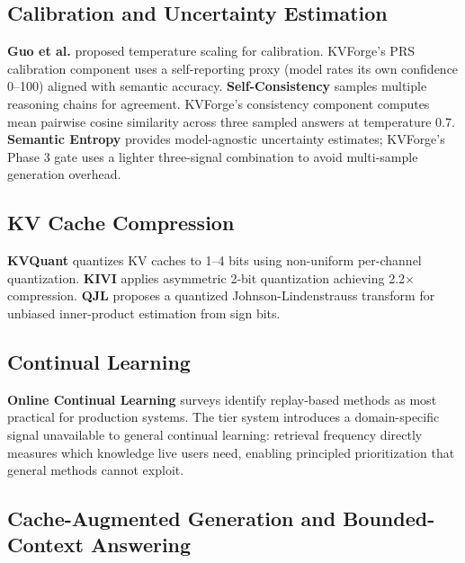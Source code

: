 \documentclass[10pt,twocolumn]{article}
\begin{document}
\subsection{Calibration and Uncertainty Estimation}

\textbf{Guo et al.} \cite{ref10} proposed temperature scaling for calibration. KVForge's PRS calibration component uses a self-reporting proxy (model rates its own confidence 0--100) aligned with semantic accuracy. \textbf{Self-Consistency} \cite{ref11} samples multiple reasoning chains for agreement. KVForge's consistency component computes mean pairwise cosine similarity across three sampled answers at temperature 0.7. \textbf{Semantic Entropy} \cite{ref12} provides model-agnostic uncertainty estimates; KVForge's Phase 3 gate uses a lighter three-signal combination to avoid multi-sample generation overhead.


\subsection{KV Cache Compression}

\textbf{KVQuant} \cite{ref18} quantizes KV caches to 1--4 bits using non-uniform per-channel quantization. \textbf{KIVI} \cite{ref19} applies asymmetric 2-bit quantization achieving 2.2$\times$ compression. \textbf{QJL} \cite{ref23} proposes a quantized Johnson-Lindenstrauss transform for unbiased inner-product estimation from sign bits.


\subsection{Continual Learning}

\textbf{Online Continual Learning} surveys \cite{ref24} identify replay-based methods as most practical for production systems. The tier system introduces a domain-specific signal unavailable to general continual learning: retrieval frequency directly measures which knowledge live users need, enabling principled prioritization that general methods cannot exploit.


\subsection{Cache-Augmented Generation and Bounded-Context Answering}
\end{document}
